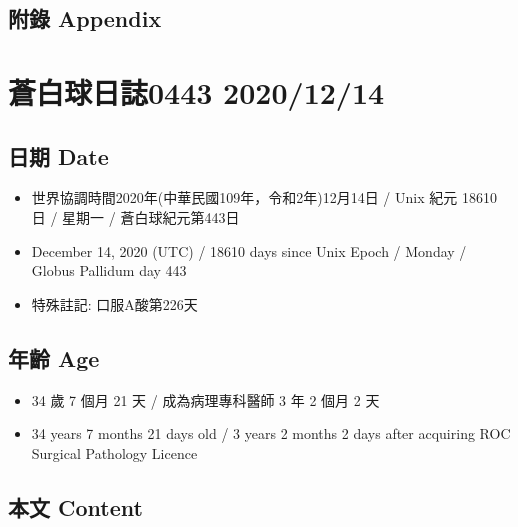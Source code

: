 \documentclass[a5paper, 11pt
]{book}
\providecommand{\tightlist}{%
  \setlength{\itemsep}{0pt}\setlength{\parskip}{0pt}}
\begin{document}
\hypertarget{ux9644ux9304-appendix-12}{%
\subsection{附錄 Appendix}\label{ux9644ux9304-appendix-12}}

\hypertarget{ux84bcux767dux7403ux65e5ux8a8c0443-20201214}{%
\section{蒼白球日誌0443
2020/12/14}\label{ux84bcux767dux7403ux65e5ux8a8c0443-20201214}}

\hypertarget{ux65e5ux671f-date-13}{%
\subsection{日期 Date}\label{ux65e5ux671f-date-13}}

\begin{itemize}
\tightlist
\item
  世界協調時間2020年(中華民國109年，令和2年)12月14日 / Unix 紀元 18610
  日 / 星期一 / 蒼白球紀元第443日
\item
  December 14, 2020 (UTC) / 18610 days since Unix Epoch / Monday /
  Globus Pallidum day 443
\item
  特殊註記: 口服A酸第226天
\end{itemize}

\hypertarget{ux5e74ux9f61-age-13}{%
\subsection{年齡 Age}\label{ux5e74ux9f61-age-13}}

\begin{itemize}
\tightlist
\item
  34 歲 7 個月 21 天 / 成為病理專科醫師 3 年 2 個月 2 天
\item
  34 years 7 months 21 days old / 3 years 2 months 2 days after
  acquiring ROC Surgical Pathology Licence
\end{itemize}

\hypertarget{ux672cux6587-content-13}{%
\subsection{本文 Content}\label{ux672cux6587-content-13}}
\end{document}
